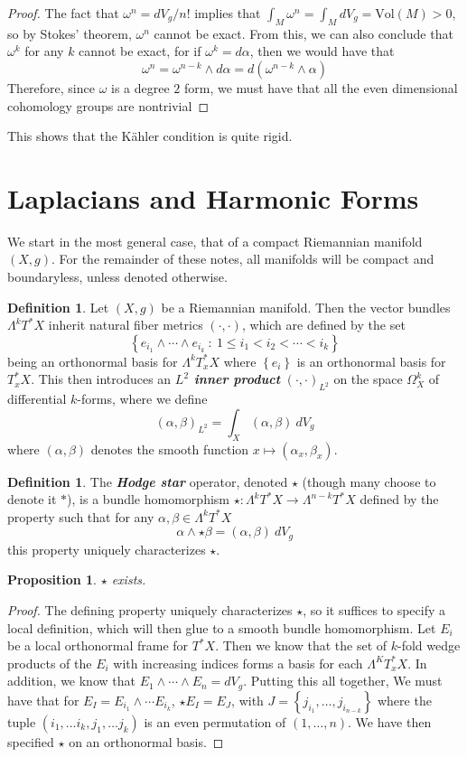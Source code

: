 \documentclass[psamsfonts, 12pt]{amsart}
\newtheorem{prop}[thm]{Proposition}
\theoremstyle{definition}
\newtheorem{defn}[thm]{Definition}
\theoremstyle{remark}
\newcommand{\ib}[1]{\textbf{\textit{#1}}}
\newcommand{\set}[1]{\left\lbrace #1 \right\rbrace}
\begin{document}
%
\begin{proof}
The fact that $\omega^n = dV_g/n!$ implies that
$\int_M \omega^n = \int_M dV_g = \mathrm{Vol}(M) > 0$, so by Stokes' theorem,
$\omega^n$ cannot be exact. From this, we can also conclude that $\omega^k$ for any
$k$ cannot be exact, for if $\omega^k = d\alpha$, then we would have that
\[
\omega^n = \omega^{n-k} \wedge d\alpha = d(\omega^{n-k} \wedge \alpha)
\]
Therefore, since $\omega$ is a degree $2$ form, we must have that all the even
dimensional cohomology groups are nontrivial
\end{proof}
%
This shows that the K\"ahler condition is quite rigid.
%
%
\section{Laplacians and Harmonic Forms}
%
We start in the most general case, that of a compact Riemannian manifold $(X,g)$. For
the remainder of these notes, all manifolds will be compact and boundaryless,
unless denoted otherwise.
%
\begin{defn}
Let $(X,g)$ be a Riemannian manifold. Then the vector bundles $\Lambda^kT^*X$
inherit natural fiber metrics $(\cdot,\cdot)$, which are defined by the set
\[
\set{e_{i_1} \wedge \cdots \wedge e_{i_k} ~:~ 1 \leq i_1 < i_2 < \cdots < i_k}
\]
being an orthonormal basis for $\Lambda^kT^*_xX$ where $\set{e_i}$ is an orthonormal
basis for $T^*_xX$. This then introduces an \ib{$L^2$ inner product}
$(\cdot,\cdot)_{L^2}$ on the space $\Omega^k_X$ of differential $k$-forms, where we
define
\[
(\alpha,\beta)_{L^2} = \int_X (\alpha,\beta)~dV_g
\]
where $(\alpha,\beta)$ denotes the smooth function $x \mapsto (\alpha_x, \beta_x)$.
\end{defn}
%
\begin{defn}
The \ib{Hodge star} operator, denoted $\star$ (though many choose to denote it $*$), is
a bundle homomorphism $\star : \Lambda^kT^*X \to \Lambda^{n-k}T^*X$ defined by the
property such that for any $\alpha,\beta \in \Lambda^kT^*X$
\[
\alpha \wedge \star\beta = (\alpha,\beta)~dV_g
\]
this property uniquely characterizes $\star$.
\end{defn}
%
\begin{prop}
$\star$ exists.
\end{prop}
%
\begin{proof}
The defining property uniquely characterizes $\star$, so it suffices to specify a
local definition, which will then glue to a smooth bundle homomorphism. Let $E_i$ be a
local orthonormal frame for $T^*X$. Then we know that the set of $k$-fold wedge products
of the $E_i$ with increasing indices forms a basis for each $\Lambda^KT^*_xX$. In
addition, we know that $E_1 \wedge \cdots \wedge E_n = dV_g$. Putting this all together,
We must have that for $E_I = E_{i_1} \wedge \cdots E_{i_k}$, $\star E_I = E_J$, with
$J = \set{j_{i_1}, \ldots ,j_{i_{n-k}}}$ where the tuple
$(i_1, \ldots i_k,j_1, \ldots j_k)$ is an even permutation of $(1, \ldots ,n)$. We have
then specified $\star$ on an orthonormal basis.
\end{proof}
\end{document}
